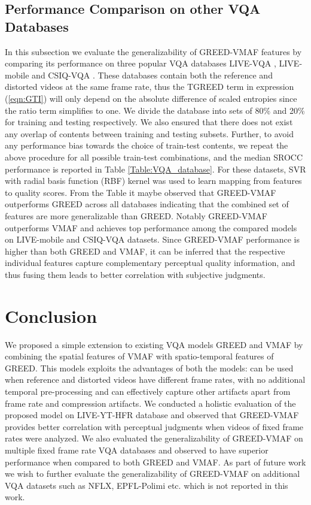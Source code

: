 \documentclass[conference]{IEEEtran}
\begin{document}
\subsection{Performance Comparison on other VQA Databases}
In this subsection we evaluate the generalizability of GREED-VMAF features by comparing its performance on three popular VQA databases LIVE-VQA \cite{seshadrinathan2010study}, LIVE-mobile \cite{moorthy2012video} and CSIQ-VQA \cite{vu2014vis3}. These databases contain both the reference and distorted videos at the same frame rate, thus the TGREED term in expression (\ref{eqn:GTI}) will only depend on the absolute difference of scaled entropies since the ratio term simplifies to one. We divide the database into sets of 80\% and 20\% for training and testing respectively. We also ensured that there does not exist any overlap of contents between training and testing subsets. Further, to avoid any performance bias towards the choice of train-test contents, we repeat the above procedure for all possible train-test combinations, and the median SROCC performance is reported in Table \ref{Table:VQA_database}. For these datasets, SVR with radial basis function (RBF) kernel was used to learn mapping from features to quality scores. From the Table it maybe observed that GREED-VMAF outperforms GREED across all databases indicating that the combined set of features are more generalizable than GREED. Notably GREED-VMAF outperforms VMAF and achieves top performance among the compared models on LIVE-mobile and CSIQ-VQA datasets. Since GREED-VMAF performance is higher than both GREED and VMAF, it can be inferred that the respective individual features capture complementary perceptual quality information, and thus fusing them leads to better correlation with subjective judgments.

\section{Conclusion}
\label{sec:conclusion}
We proposed a simple extension to existing VQA models GREED and VMAF by combining the spatial features of VMAF with spatio-temporal features of GREED. This models exploits the advantages of both the models: can be used when reference and distorted videos have different frame rates, with no additional temporal pre-processing and can effectively capture other artifacts apart from frame rate and compression artifacts. We conducted a holistic evaluation of the proposed model on LIVE-YT-HFR database and observed that GREED-VMAF provides better correlation with perceptual judgments when videos of fixed frame rates were analyzed. We also evaluated the generalizability of GREED-VMAF on multiple fixed frame rate VQA databases and observed to have superior performance when compared to both GREED and VMAF. As part of future work we wish to further evaluate the generalizability of GREED-VMAF on additional VQA datasets such as NFLX, EPFL-Polimi etc. which is not reported in this work.


\end{document}
